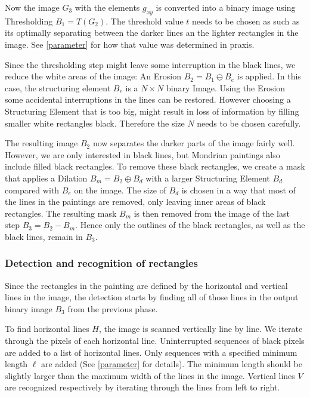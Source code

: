 \documentclass[serif,article,noparskip]{agse-thesis}
\begin{document}
Now the image $G_3$ with the elements $g_{xy}$ is converted into a binary image
using Thresholding $B_1 = T(G_2)$. The threshold value $t$ needs to be chosen
as such as its optimally separating between the darker lines an the lighter
rectangles in the image. See \ref{parameter} for how that value was determined
in praxis.

Since the thresholding step might leave some interruption in the black lines, we
reduce the white areas of the image: An Erosion $B_2 = B_1 \ominus B_e$ is
applied. In this case, the structuring element $B_e$ is a $N\times N$ binary
Image. Using the Erosion some accidental interruptions in the lines can be
restored. However choosing a Structuring Element that is too big, might
result in loss of information by filling smaller white rectangles black.
Therefore the size $N$ needs to be chosen carefully.

The resulting image $B_2$ now separates the darker parts of the image fairly
well. However, we are only interested in black lines, but Mondrian paintings
also include filled black rectangles. To remove these black rectangles, we
create a mask that applies a Dilation $B_m = B_2 \oplus B_d$ with a larger
Structuring Element $B_d$ compared with $B_e$ on the image. The size of $B_d$ is
chosen in a way that most of the lines in the paintings are removed, only
leaving inner areas of black rectangles. The resulting mask $B_m$ is then
removed from the image of the last step $B_3 = B_2 - B_m$. Hence only the
outlines of the black rectangles, as well as the black lines, remain in $B_3$.

\subsubsection{Detection and recognition of rectangles} \label{rectangles}

Since the rectangles in the painting are defined by the horizontal and
vertical lines in the image, the detection starts by finding all of those lines
in the output binary image $B_3$ from the previous phase.


To find horizontal lines $H$, the image is scanned vertically line by line. We
iterate through the pixels of each horizontal line. Uninterrupted sequences of
black pixels are added to a list of horizontal lines. Only sequences with a
specified minimum length $\ell$ are added (See \ref{parameter} for details).
The minimum length should be slightly larger than the maximum width of the lines
in the image. Vertical lines $V$ are recognized respectively by iterating
through the lines from left to right.
\end{document}
